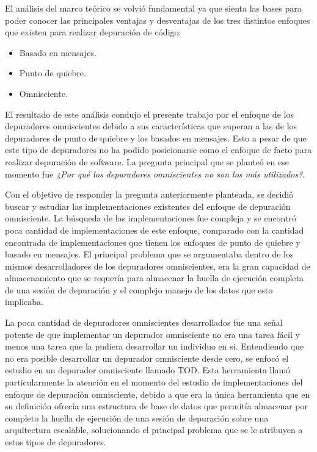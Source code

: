 \documentclass[12pt,legalpaper]{report}
\begin{document}
El análisis del marco teórico se volvió fundamental ya que sienta las bases para poder conocer las principales ventajas y desventajas de los tres distintos enfoques que existen para realizar depuración de código:

\begin{itemize}
	\item Basado en mensajes.
	\item Punto de quiebre.
	\item Omnisciente.
\end{itemize}

El resultado de este análisis condujo el presente trabajo por el enfoque de los depuradores omniscientes debido a sus características que superan a las de los depuradores de punto de quiebre y los basados en mensajes.  Esto a pesar de que este tipo de depuradores no ha podido posicionarse como el enfoque de facto para realizar depuración de software.  La pregunta principal que se planteó en ese momento fue \textit{¿Por qué los depuradores omniscientes no son los más utilizados?}.  

Con el objetivo de responder la pregunta anteriormente planteada, se decidió buscar y estudiar las implementaciones existentes del enfoque de depuración omnisciente.  La búsqueda de las implementaciones fue compleja y se encontró poca cantidad de implementaciones de este enfoque, comparado con la cantidad encontrada de implementaciones que tienen los enfoques de punto de quiebre y basado en mensajes.  El principal problema que se argumentaba dentro de los mismos desarrolladores de los depuradores omniscientes, era la gran capacidad de almacenamiento que se requería para almacenar la huella de ejecución completa de una sesión de depuración y el complejo manejo de los datos que esto implicaba. 

La poca cantidad de depuradores omniscientes desarrollados fue una señal potente de que implementar un depurador omnisciente no era una tarea fácil y menos una tarea que la pudiera desarrollar un individuo en si.  Entendiendo que no era posible desarrollar un depurador omnisciente desde cero, se enfocó el estudio en un depurador omnisciente llamado TOD.  Esta herramienta llamó particularmente la atención en el momento del estudio de implementaciones del enfoque de depuración omnisciente, debido a que era la única herramienta que en su definición ofrecía una estructura de base de datos que permitía almacenar por completo la huella de ejecución de una sesión de depuración sobre una arquitectura escalable, solucionando el principal problema que se le atribuyen a estos tipos de depuradores.
\end{document}
